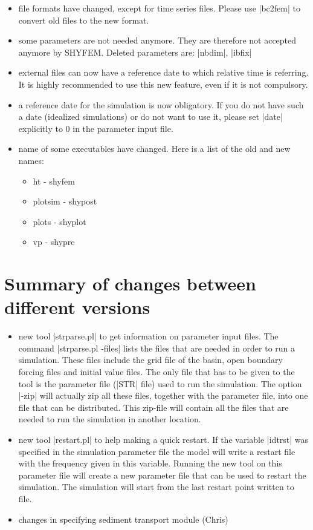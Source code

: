 \documentclass[12pt,draft]{article}
\newcommand{\shyfem}{SHYFEM}
\begin{document}
\begin{itemize}
\item file formats have changed, except for time series files. Please use |bc2fem| to convert old files to the new format.
\item some parameters are not needed anymore. They are therefore not accepted anymore by \shyfem. Deleted parameters
are: |nbdim|, |ibfix|
\item external files can now have a reference date to which relative
time is referring. It is highly recommended to use this new feature,
even if it is not compulsory.
\item a reference date for the simulation is now obligatory. If
you do not have such a date (idealized simulations) or do
not want to use it, please set |date| explicitly to 0 in the parameter
input file.
\item name of some executables have changed. Here is a list
of the old and new names:
\begin{itemize}
\item ht - shyfem
\item plotsim - shypost
\item plots - shyplot
\item vp - shypre
\end{itemize}

\end{itemize}

\section{Summary of changes between different versions}

\begin{itemize}
\item new tool |strparse.pl| to get information on parameter input files.
The command |strparse.pl -files| lists the files that are needed
in order to run a simulation. These files include the grid file
of the basin, open boundary forcing files and initial value files.
The only file that has to be given to the tool is the parameter
file (|STR| file) used to run the simulation.
The option |-zip| will actually zip all these files, together with the
parameter file, into one file that can be distributed. This zip-file
will contain all the files that are needed to run the simulation
in another location.
\item new tool |restart.pl| to help making a quick restart. If the variable
|idtrst| was specified in the simulation parameter file the model
will write a restart file with the frequency given in this variable.
Running the new tool on this parameter file will create a new
parameter file that can be used to restart the simulation. The
simulation will start from the last restart point written to file.
\item changes in specifying sediment transport module (Chris)


\end{itemize}
\end{document}
